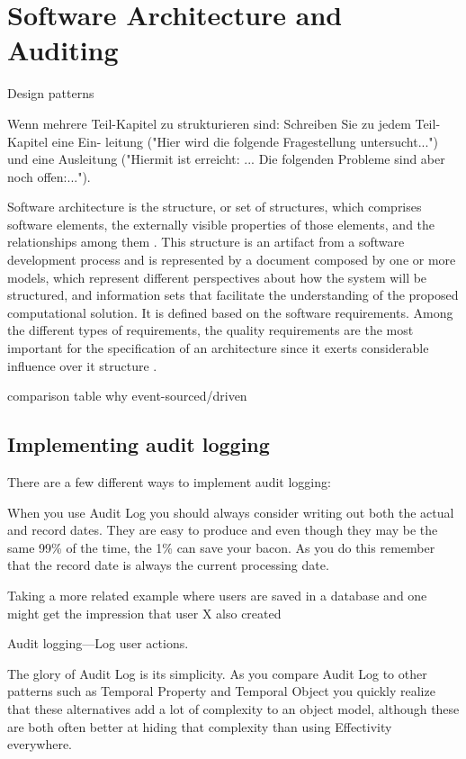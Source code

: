 %
\chapter{Software Architecture and Auditing}\label{chap:sadt}
Design patterns

Wenn mehrere Teil-Kapitel zu strukturieren sind: Schreiben Sie zu jedem Teil-Kapitel eine Ein- leitung ("Hier wird die folgende Fragestellung untersucht...") und eine Ausleitung ("Hiermit ist erreicht: ... Die folgenden Probleme sind aber noch offen:...").

Software architecture is the structure, or set of structures, which comprises
software elements, the externally visible properties of those elements, and the
relationships among them \citep{SAIP}. This structure is an artifact from a software
development process and is represented by a document composed by one or more
models, which represent different perspectives about how the system will be
structured, and information sets that facilitate the understanding of the proposed
computational solution. It is defined based on the software requirements. Among the
different types of requirements, the quality requirements are the most important for
the specification of an architecture since it exerts considerable influence over it
structure \citep{SAIP}.

comparison table why event-sourced/driven \citep{richards2015software}

\section{Implementing audit logging}

There are a few different ways to implement audit logging:~\citep{richardson2018microservices}

When you use Audit Log you should always consider writing out both the actual and record dates. They are easy to produce and even though they may be the same 99\% of the time, the 1\% can save your bacon. As you do this remember that the record date is always the current processing date. \citep{AuditLog}

Taking a more related example where users are saved in a database and one might get the impression that user X also created 

Audit logging—Log user actions.

The glory of Audit Log is its simplicity. As you compare Audit Log to other patterns such as Temporal Property and Temporal Object you quickly realize that these alternatives add a lot of complexity to an object model, although these are both often better at hiding that complexity than using Effectivity everywhere.

